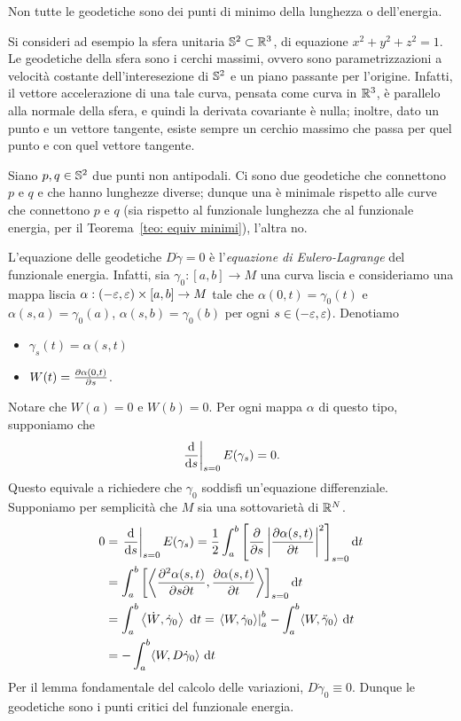 	Non tutte le geodetiche sono dei punti di minimo della lunghezza o dell'energia. 
	
	\begin{es}\label{es: geodetiche non minimi}
		Si consideri ad esempio la sfera unitaria \(\mathbb{S}^2 \subset \mathbb{R}^3\), di equazione \(x^2+y^2+z^2=1\). Le geodetiche della sfera sono i cerchi massimi, ovvero sono parametrizzazioni a velocità costante dell'interesezione di \(\mathbb{S}^2\) e un piano passante per l'origine. Infatti, il vettore accelerazione di una tale curva, pensata come curva in \(\mathbb{R}^3\), è parallelo alla normale della sfera, e quindi la derivata covariante è nulla; inoltre, dato un punto e un vettore tangente, esiste sempre un cerchio massimo che passa per quel punto e con quel vettore tangente. 
		
		Siano \(p,q \in \mathbb{S}^2\) due punti non antipodali. Ci sono due geodetiche che connettono \(p\) e \(q\) e che hanno lunghezze diverse; dunque una è minimale rispetto alle curve che connettono \(p\) e \(q\) (sia rispetto al funzionale lunghezza che al funzionale energia, per il Teorema~\ref{teo: equiv minimi}), l'altra no.
		
		
	\end{es}
	
	L'equazione delle geodetiche \(D\dot \gamma =0\) è l'\textit{equazione di Eulero-Lagrange} del funzionale energia. Infatti, sia \(\gamma_0:[a,b] \to M\) una curva liscia e consideriamo una mappa liscia \(\alpha:(-\varepsilon,\varepsilon) \times [a,b] \to M\) tale che \(\alpha(0,t) = \gamma_0(t)\) e \(\alpha(s,a)=\gamma_0(a)\), \(\alpha(s,b)=\gamma_0(b)\) per ogni \(s \in (-\varepsilon,\varepsilon)\). Denotiamo
	\begin{itemize}
		\item \(\gamma_s(t) = \alpha(s,t)\)
		\item \(W(t) = \frac{\partial \alpha(0,t)}{\partial s}\).
	\end{itemize}
	Notare che \(W(a)=0\) e \(W(b)=0\). Per ogni mappa \(\alpha\) di questo tipo, supponiamo che
	\[
		\left.\frac{\mathrm{d}}{\mathrm{d} s}\right|_{s=0} E(\gamma_s) = 0.
	\]
	Questo equivale a richiedere che \(\gamma_0\) soddisfi un'equazione differenziale. Supponiamo per semplicità che \(M\) sia una sottovarietà di \(\mathbb{R}^N\). 
	\begin{align*}
		0 &= \left.\frac{\mathrm{d}}{\mathrm{d} s}\right|_{s=0} E(\gamma_s) = \frac{1}{2}\int_a^b \left[ \frac{\partial}{\partial s} \left| \frac{\partial \alpha(s,t)}{\partial t}\right|^2 \right]_{s=0} \mathrm{d} t \\
		&= \int_a^b \left[ \left\langle \frac{\partial^2 \alpha(s,t)}{\partial s\partial t}, \frac{\partial \alpha(s,t)}{\partial t} \right\rangle \right]_{s=0} \mathrm{d} t \\
		& = \int_a^b \left\langle \dot W, \dot \gamma_0 \right\rangle  \ \mathrm{d} t =  \left.\langle W,\dot \gamma_0 \rangle\right|_a^b - \int_a^b \langle W, \ddot \gamma_0 \rangle  \ \mathrm{d} t \\
		&= -\int_a^b \langle W, D \dot \gamma_0 \rangle  \ \mathrm{d} t 
	\end{align*}
	Per il lemma fondamentale del calcolo delle variazioni, \(D \dot \gamma_0 \equiv 0\). Dunque le geodetiche sono i punti critici del funzionale energia.
	
